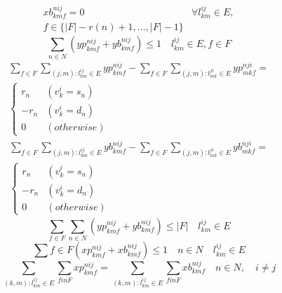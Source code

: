 \documentclass[a4j,twocolumn,fleqn]{jarticle}
\begin{document}
\begin{eqnarray}%
xb^{nij}_{kmf} = 0 & \forall l^{ij}_{km} \in E, \\
f \in \{|F| - r(n)+1, \dots ,|F|-1\}\nonumber
\end{eqnarray}%
\begin{equation}%
\sum_{n \in N} (yp^{nij}_{kmf} + yb^{nij}_{kmf}) \leq 1 \quad l^{ij}_{km} \in E, f \in F
\end{equation}%
\begin{eqnarray}%
\sum_{f \in F}\sum_{(j,m):l^{ij}_{km}\in E}yp^{nij}_{kmf} - \sum_{f \in F}\sum_{(j,m):l^{ji}_{mk}\in E}yp^{nji}_{mkf}= \nonumber \\
\begin{cases}
r_n & (v^i_k = s_n)\\
-r_n & (v^i_k =d_n)\\
0 & (otherwise)
\end{cases}
\end{eqnarray}%
\begin{eqnarray}%
\sum_{f \in F}\sum_{(j,m):l^{ij}_{km}\in E}yb^{nij}_{kmf} - \sum_{f \in F}\sum_{(j,m):l^{ji}_{mk}\in E}yb^{nji}_{mkf}= \nonumber \\
\begin{cases}
r_n & (v^i_k = s_n)\\
-r_n & (v^i_k =d_n)\\
0 & (otherwise)
\end{cases}
\end{eqnarray}%
\begin{equation}
\sum_{f \in F} \sum_{n \in N}(yp^{nij}_{kmf}+yb^{nij}_{kmf}) \leq |F| \quad  l^{ij}_{km} \in E
\end{equation}
\begin{equation}
\sum{f \in F}(xp^{nij}_{kmf} + xb^{nij}_{kmf}) \leq 1 \quad n \in N \quad l^{ij}_{km} \in E
\end{equation}
\begin{equation}
\sum_{(k,m):l^{ij}_{km} \in E}\sum_{f in F}xp^{nij}_{kmf} = \sum_{(k,m):l^{ij}_{km}\in E}\sum_{f in F}xb^{nij}_{kmf}\quad n \in N,\quad i \neq j
\end{equation}
\end{document}
